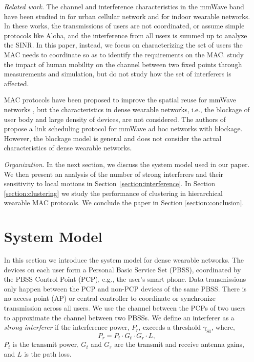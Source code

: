 \documentclass[10pt, conference, letterpaper]{IEEEtran}
\begin{document}
\emph{Related work.}
The channel and interference characteristics in the mmWave band have been studied in \cite{urbanblockage} for urban cellular network and \cite{interferencefinitesized}\cite{enclosedmmwave} for indoor wearable networks. 
In these works, the transmissions of users are not coordinated, or assume simple protocols like Aloha, and the interference from all users is summed up to analyze the SINR.
In this paper, instead, we focus on characterizing the set of users the MAC needs to coordinate so as to identify the requirements on the MAC.
\cite{humanactivity}\cite{timevaryingpathshadowing}\cite{blockagein60ghz} study the impact of human mobility on the channel between two fixed points through measurements and simulation, but do not study how the set of interferers is affected.


MAC protocols have been proposed to improve the spatial reuse for mmWave networks \cite{dtdmac}\cite{mdmac}\cite{intersharing}, but the characteristics in dense wearable networks, i.e., the blockage of user body and large density of devices, are not considered.
The authors of \cite{onlinkscheduling} propose a link scheduling protocol for mmWave ad hoc networks with blockage. However, the blockage model is general and does not consider the actual characteristics of dense wearable networks.

\emph{Organization.}
In the next section, we discuss the system model used in our paper. 
We then present an analysis of the number of strong interferers and their sensitivity to local motions in Section~\ref{section:interference}. 
In Section \ref{section:clustering} we study the performance of clustering in hierarchical wearable MAC protocols.
We conclude the paper in Section \ref{section:conclusion}.

\section{System Model}
In this section we introduce the system model for dense wearable networks. 
The devices on each user form a Personal Basic Service Set (PBSS), coordinated by the PBSS Control Point (PCP), e.g., the user's smart phone.
Data transmissions only happen between the PCP and non-PCP devices of the same PBSS.
There is no access point (AP) or central controller to coordinate or synchronize transmission across all users. %
We use the channel between the PCPs of two users to approximate the channel between two PBSSs. 
We define an interferer as a \emph{strong interferer} if the interference power, $P_r$, exceeds a threshold $\gamma_{\mathrm{SI}}$, where, 
\begin{equation*}
P_r = P_t\cdot G_t\cdot G_r\cdot L, 
\end{equation*}
$P_t$ is the transmit power, $G_t$ and $G_r$ are the transmit and receive antenna gains, and $L$ is the path loss.
\end{document}
